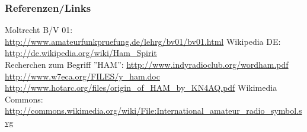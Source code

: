 \begin{frame}
    \frametitle{Referenzen/Links}
    \hypertarget{refs}{}
    \footnotesize

    \begin{thebibliography}{}
         Moltrecht B/V 01: \\
                        \url{http://www.amateurfunkpruefung.de/lehrg/bv01/bv01.html}
            Wikipedia DE: \\
                        \url{http://de.wikipedia.org/wiki/Ham_Spirit} \\
           Recherchen zum Begriff ''HAM'':
                        \url{http://www.indyradioclub.org/wordham.pdf} \\
                        \url{http://www.w7eca.org/FILES/y_ham.doc} \\
                        \url{http://www.hotarc.org/files/origin_of_HAM_by_KN4AQ.pdf}
            Wikimedia Commons: \\
                        \url{http://commons.wikimedia.org/wiki/File:International_amateur_radio_symbol.svg}
    \end{thebibliography} 
   
\end{frame}


